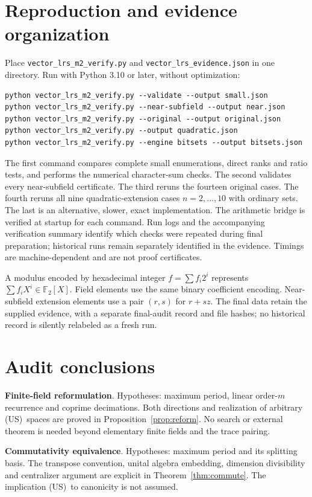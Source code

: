 \documentclass[11pt,a4paper]{article}
\theoremstyle{definition}\newtheorem{definition}[theorem]{Definition}
\theoremstyle{remark}\newtheorem{remark}[theorem]{Remark}
\newcommand{\F}{\mathbb F}
\newcommand{\US}{\textup{(US)}}
\numberwithin{equation}{section}
\begin{document}
\section{Reproduction and evidence organization}\label{app:reproduce}
Place \texttt{vector\_lrs\_m2\_verify.py} and \texttt{vector\_lrs\_evidence.json} in one directory. Run with Python 3.10 or later, without optimization:
\begin{verbatim}
python vector_lrs_m2_verify.py --validate --output small.json
python vector_lrs_m2_verify.py --near-subfield --output near.json
python vector_lrs_m2_verify.py --original --output original.json
python vector_lrs_m2_verify.py --output quadratic.json
python vector_lrs_m2_verify.py --engine bitsets --output bitsets.json
\end{verbatim}
The first command compares complete small enumerations, direct ranks and ratio tests, and performs the numerical character-sum checks. The second validates every near-subfield certificate. The third reruns the fourteen original cases. The fourth reruns all nine quadratic-extension cases $n=2,\ldots,10$ with ordinary sets. The last is an alternative, slower, exact implementation. The arithmetic bridge is verified at startup for each command. Run logs and the accompanying verification summary identify which checks were repeated during final preparation; historical runs remain separately identified in the evidence. Timings are machine-dependent and are not proof certificates.

A modulus encoded by hexadecimal integer $f=\sum f_i2^i$ represents $\sum f_iX^i\in\F_2[X]$. Field elements use the same binary coefficient encoding. Near-subfield extension elements use a pair $(r,s)$ for $r+sz$. The final data retain the supplied evidence, with a separate final-audit record and file hashes; no historical record is silently relabeled as a fresh run.

\section{Audit conclusions}\label{app:audit}
\textbf{Finite-field reformulation}. Hypotheses: maximum period, linear order-$m$ recurrence and coprime decimations. Both directions and realization of arbitrary \US\ spaces are proved in Proposition~\ref{prop:reform}. No search or external theorem is needed beyond elementary finite fields and the trace pairing.

\begin{samepage}
\textbf{Commutativity equivalence}. Hypotheses: maximum period and its splitting basis. The transpose convention, unital algebra embedding, dimension divisibility and centralizer argument are explicit in Theorem~\ref{thm:commute}. The implication \US\ to canonicity is not assumed.
\end{samepage}
\end{document}
